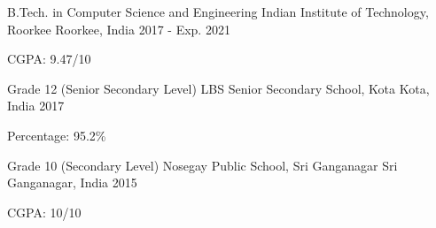 

\begin{cventries}

  \cventry
    {B.Tech. in Computer Science and Engineering} %
    {Indian Institute of Technology, Roorkee} %
    {Roorkee, India} %
    {2017 - Exp. 2021} %
    {
      \begin{cvitems} %
        \item {CGPA: 9.47/10}
      \end{cvitems}
    }

  \cventry
    {Grade 12 (Senior Secondary Level)} %
    {LBS Senior Secondary School, Kota} %
    {Kota, India} %
    {2017} %
    {
      \begin{cvitems} %
        \item {Percentage: 95.2\%}
      \end{cvitems}
    }

  \cventry
    {Grade 10 (Secondary Level)} %
    {Nosegay Public School, Sri Ganganagar} %
    {Sri Ganganagar, India} %
    {2015} %
    {
      \begin{cvitems} %
        \item {CGPA: 10/10}
      \end{cvitems}
    }

\end{cventries}
